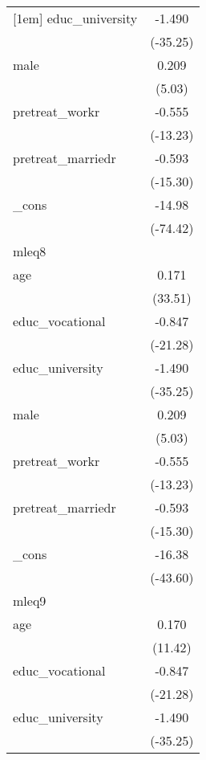 {\begin{tabular}{l*{1}{c}}
[1em]
educ\_university&      -1.490\sym{***}\\
            &    (-35.25)         \\
[1em]
male        &       0.209\sym{***}\\
            &      (5.03)         \\
[1em]
pretreat\_workr&      -0.555\sym{***}\\
            &    (-13.23)         \\
[1em]
pretreat\_marriedr&      -0.593\sym{***}\\
            &    (-15.30)         \\
[1em]
\_cons      &      -14.98\sym{***}\\
            &    (-74.42)         \\
\hline
mleq8       &                     \\
age         &       0.171\sym{***}\\
            &     (33.51)         \\
[1em]
educ\_vocational&      -0.847\sym{***}\\
            &    (-21.28)         \\
[1em]
educ\_university&      -1.490\sym{***}\\
            &    (-35.25)         \\
[1em]
male        &       0.209\sym{***}\\
            &      (5.03)         \\
[1em]
pretreat\_workr&      -0.555\sym{***}\\
            &    (-13.23)         \\
[1em]
pretreat\_marriedr&      -0.593\sym{***}\\
            &    (-15.30)         \\
[1em]
\_cons      &      -16.38\sym{***}\\
            &    (-43.60)         \\
\hline
mleq9       &                     \\
age         &       0.170\sym{***}\\
            &     (11.42)         \\
[1em]
educ\_vocational&      -0.847\sym{***}\\
            &    (-21.28)         \\
[1em]
educ\_university&      -1.490\sym{***}\\
            &    (-35.25)         \\
[1em]

\end{tabular}}
